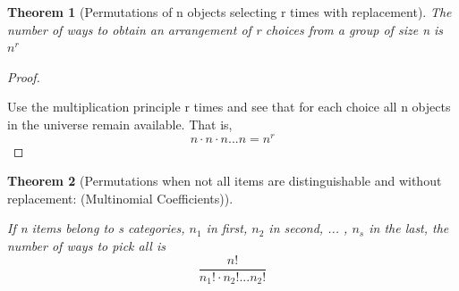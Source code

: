 \documentclass[10pt,]{book}
\theoremstyle{plain}
\newtheorem{theorem}{Theorem}[section]
\theoremstyle{definition}
\theoremstyle{definition}
\theoremstyle{definition}
\numberwithin{equation}{section}
\begin{document}
\begin{theorem}[{Permutations of n objects selecting r times with replacement}]\label{theorem-12}
The number of ways to obtain an arrangement of r choices from a group of size n is \(n^r\)\end{theorem}
\begin{proof}\hypertarget{proof-9}{}

			Use the multiplication principle r times and see that for each choice all n objects in the universe remain available.  That is, 
			\begin{equation*}n \cdot n \cdot n ... n = n^r\end{equation*}
\end{proof}
\begin{theorem}[{Permutations when not all items are distinguishable and without replacement: (Multinomial Coefficients)}]\label{theorem-13}

If n items belong to s categories, \(n_1\) in first, \(n_2\) in second, ... , \(n_s\) in the last, the number of ways to pick all is
		\begin{equation*}\frac{n!}{n_1! \cdot n_2! ... n_2!}\end{equation*}\end{theorem}
\typeout{************************************************}
\typeout{************************************************}
\end{document}
